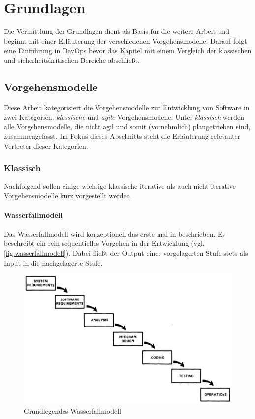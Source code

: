\chapter{Grundlagen} %

Die Vermittlung der Grundlagen dient als Basis für die weitere Arbeit und beginnt mit einer Erläuterung der verschiedenen Vorgehensmodelle.
Darauf folgt eine Einführung in DevOps bevor das Kapitel mit einem Vergleich der klassischen und sicherheitskritischen Bereiche abschließt.

\section{Vorgehensmodelle} %

Diese Arbeit kategorisiert die Vorgehensmodelle zur Entwicklung von Software in zwei Kategorien: \emph{klassische} und \emph{agile} Vorgehensmodelle.
Unter \emph{klassisch} werden alle Vorgehensmodelle, die nicht agil und somit (vornehmlich) plangetrieben sind, zusammengefasst.
Im Fokus dieses Abschnitts steht die Erläuterung relevanter Vertreter dieser Kategorien.

\subsection{Klassisch} %

Nachfolgend sollen einige wichtige klassische iterative als auch nicht-iterative Vorgehensmodelle kurz vorgestellt werden.

\subsubsection{Wasserfallmodell}

Das Wasserfallmodell wird konzeptionell das erste mal in \parencite[][]{Royce:1970aa} beschrieben.
Es beschreibt ein rein sequentielles Vorgehen in der Entwicklung (vgl. \autoref{fig:wasserfallmodell}). 
Dabei fließt der Output einer vorgelagerten Stufe stets als Input in die nachgelagerte Stufe.

\begin{figure}
  \centering
  \includegraphics[width=\textwidth]{img/wasserfallmodell.png}
  \caption{Grundlegendes Wasserfallmodell \parencite[][]{Royce:1970aa}}
  \label{fig:wasserfallmodell}
\end{figure}

